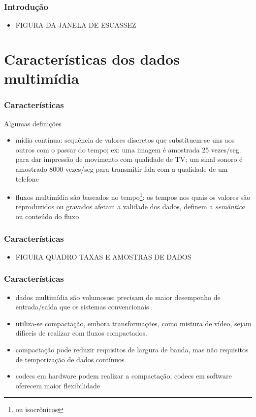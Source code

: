 \documentclass[]{beamer}
\begin{document}
\begin{frame}
  \frametitle{Introdução}
\begin{itemize}
  \item FIGURA DA JANELA DE ESCASSEZ
\end{itemize}
\end{frame}

\section{Características dos dados multimídia}

\begin{frame}
  \frametitle{Características}
Algumas definições
\begin{itemize}
  \item mídia contínua: sequência de valores discretos que substituem-se uns aos outros
com o passar do tempo; ex: uma imagem é amostrada 25 vezes/seg. para 
dar impressão de movimento com qualidade de TV; um sinal sonoro é amostrado
8000 vezes/seg para transmitir fala com a qualidade de um telefone
  \item fluxos multimídia são baseados no tempo\footnote{ou isocrônicos}: os tempos nos quais
os valores são reproduzidos ou gravados afetam a validade dos dados, definem 
a \emph{semântica} ou conteúdo do fluxo
  
\end{itemize}
\end{frame}

\begin{frame}
  \frametitle{Características}
\begin{itemize}
  \item FIGURA QUADRO TAXAS E AMOSTRAS DE DADOS
\end{itemize}
\end{frame}

\begin{frame}
  \frametitle{Características}
\begin{itemize}
\item dados multimídia são volumosos: precisam de maior desempenho de entrada/saída que os
sistemas convencionais
  \item utiliza-se compactação, embora transformações, como mistura de vídeo, sejam 
difíceis de realizar com fluxos compactados.
  \item compactação pode reduzir requisitos de largura de banda, mas não requisitos de
temporização de dados contínuos
  \item codecs em hardware podem realizar a compactação; codecs em software oferecem
maior flexibilidade
\end{itemize}
\end{frame}
\end{document}

